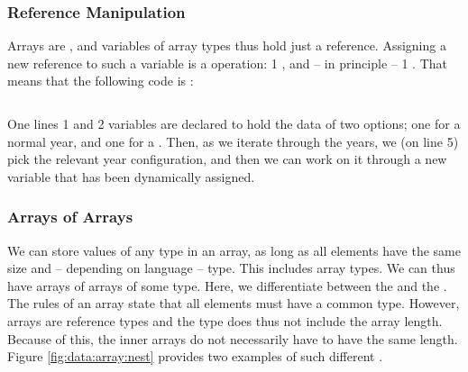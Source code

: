 %
%

\subsubsection{Reference Manipulation}

Arrays are , and variables of array types thus hold just a reference. Assigning a new reference to such a variable is a  operation: 1 , and -- in principle -- 1 . That means that the following code is :

\inputminted[linenos]{csharp}{../src/csharp/primdata/leapmonths/Program.cs}

One lines 1 and 2 variables are declared to hold the data of two options; one for a normal year, and one for a . Then, as we iterate through the years, we (on line 5) pick the relevant year configuration, and then we can work on it through a new variable that has been dynamically assigned.

\subsubsection{Arrays of Arrays}
\label{sec:primdata:arraysOfArrays}

We can store values of any type in an array, as long as all elements have the same size and -- depending on language -- type. This includes array types. We can thus have arrays of arrays of some type. Here, we differentiate between the  and the . The rules of an array state that all elements must have a common type. However, arrays are reference types and the type does thus not include the array length. Because of this, the inner arrays do not necessarily have to have the same length. Figure \ref{fig:data:array:nest} provides two examples of such different .

